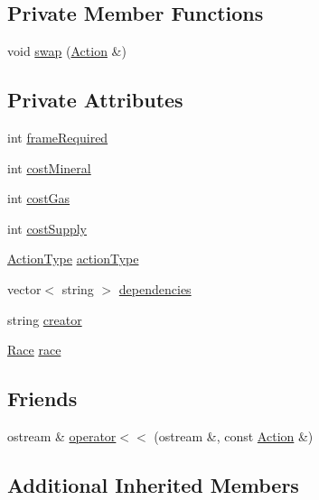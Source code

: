\subsection*{Private Member Functions}
\begin{DoxyCompactItemize}
\item 
void \hyperlink{classghost_1_1Action_a8c965c1de8861fd2fd49cec707d94be0}{swap} (\hyperlink{classghost_1_1Action}{Action} \&)
\end{DoxyCompactItemize}
\subsection*{Private Attributes}
\begin{DoxyCompactItemize}
\item 
int \hyperlink{classghost_1_1Action_a9b440d6806597b8f87f342a03fcaa39f}{frame\-Required}
\item 
int \hyperlink{classghost_1_1Action_abc5c6f31a411189a0dbd57a42e20c723}{cost\-Mineral}
\item 
int \hyperlink{classghost_1_1Action_a19015ea4ddcabea95f610b1a5450b3a0}{cost\-Gas}
\item 
int \hyperlink{classghost_1_1Action_ac804f6d585c2b9df3bc9809539f72db3}{cost\-Supply}
\item 
\hyperlink{namespaceghost_a7c0deb8266504feb7d025903f2b77693}{Action\-Type} \hyperlink{classghost_1_1Action_ab4a95e2a3030b8d81ae5da00f11c6118}{action\-Type}
\item 
vector$<$ string $>$ \hyperlink{classghost_1_1Action_a0e7e5f84cc8d24bed8d83021602b02c2}{dependencies}
\item 
string \hyperlink{classghost_1_1Action_ab4862cbb4a415783306abbd1a2c57472}{creator}
\item 
\hyperlink{namespaceghost_a8b1db75c40c6980adcf244ddccc0324b}{Race} \hyperlink{classghost_1_1Action_a040eaa1d69dc99221cbdf48d84ce6edb}{race}
\end{DoxyCompactItemize}
\subsection*{Friends}
\begin{DoxyCompactItemize}
\item 
ostream \& \hyperlink{classghost_1_1Action_a44b75b6ed85320c12cd00afe16e9872d}{operator$<$$<$} (ostream \&, const \hyperlink{classghost_1_1Action}{Action} \&)
\end{DoxyCompactItemize}
\subsection*{Additional Inherited Members}


